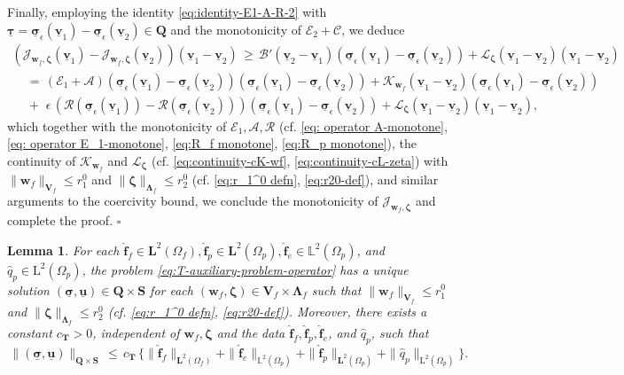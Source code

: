 \documentclass[11pt]{article}
\numberwithin{equation}{section}
\newcommand{\ds}{\displaystyle}
\newcommand{\bLambda}{{\boldsymbol\Lambda}}
\newcommand{\bsi}{{\boldsymbol\sigma}}
\newcommand{\btau}{{\boldsymbol\tau}}
\newcommand{\bzeta}{{\boldsymbol\zeta}}
\newcommand{\ubsi}{\underline{\bsi}}
\newcommand{\ubtau}{\underline{\btau}}
\newcommand{\ubu}{\underline{\bu}}
\newcommand{\ubv}{\underline{\bv}}
\newcommand{\bv}{{\mathbf{v}}}
\newcommand{\bw}{{\mathbf{w}}}
\newcommand{\f}{\mathbf{f}}
\newcommand{\bu}{\mathbf{u}}
\newcommand{\0}{{\mathbf{0}}}
\def\bV{\mathbf{V}}
\def\bT{\mathbf{T}}
\def\bQ{\mathbf{Q}}
\def\bS{\mathbf{S}}
\newcommand{\bL}{\mathbf{L}}
\newcommand\bbL{\mathbb{L}}
\newcommand{\cA}{\mathcal{A}}
\newcommand{\cB}{\mathcal{B}}
\newcommand{\cC}{\mathcal{C}}
\newcommand{\cE}{\mathcal{E}}
\newcommand{\cJ}{\mathcal{J}}
\newcommand{\cK}{\mathcal{K}}
\newcommand{\cL}{\mathcal{L}}
\newcommand{\cR}{\mathcal{R}}
\def\L{\mathrm{L}}
\def\wh{\widehat}
\newtheorem{lem}[thm]{Lemma}
\newenvironment{proof}{\noindent{\it Proof.}}{\hfill$\square$}
\numberwithin{equation}{section}
\begin{document}
\begin{proof}
Finally, employing the identity \eqref{eq:identity-E1-A-R-2} with $\ubtau = \ubsi_\epsilon(\ubv_1) - \ubsi_\epsilon(\ubv_2)\in \bQ$ and the monotonicity of $\cE_2 + \cC$, we deduce
\begin{equation*}
\begin{array}{l}
\ds (\cJ_{\bw_f,\bzeta}(\ubv_1) - \cJ_{\bw_f,\bzeta}(\ubv_2))(\ubv_1 - \ubv_2) 
\,\geq\, \cB'(\ubv_2 - \ubv_1)(\ubsi_\epsilon(\ubv_1) - \ubsi_\epsilon(\ubv_2))+\cL_{\bzeta}(\ubv_1 - \ubv_2) (\ubv_1 - \ubv_2)  \\ [2ex]
\ds\quad \,=\, (\cE_1 + \cA)(\ubsi_\epsilon(\ubv_1) - \ubsi_\epsilon(\ubv_2))(\ubsi_\epsilon(\ubv_1) - \ubsi_\epsilon(\ubv_2)) + \cK_{\bw_f}(\ubv_1 - \ubv_2)(\ubsi_\epsilon(\ubv_1) - \ubsi_\epsilon(\ubv_2)) \\ [2ex]
\ds\quad \,+\,\,\epsilon\,(\cR(\ubsi_\epsilon(\ubv_1)) - \cR(\ubsi_\epsilon(\ubv_2)))(\ubsi_\epsilon(\ubv_1) - \ubsi_\epsilon(\ubv_2))+\cL_{\bzeta}(\ubv_1 - \ubv_2) (\ubv_1 - \ubv_2) ,
\end{array}
\end{equation*}
which together with the monotonicity of $\cE_1, \cA, \cR$ (cf. \eqref{eq: operator A-monotone}, \eqref{eq: operator E_1-monotone}, \eqref{eq:R_f monotone}, \eqref{eq:R_p monotone}), the continuity of $\cK_{\bw_f}$ and $\cL_{\bzeta}$ (cf. \eqref{eq:continuity-cK-wf}, \eqref{eq:continuity-cL-zeta}) with $\|\bw_f\|_{\bV_f} \leq r_1^0$ and $\|\bzeta\|_{\bLambda_f} \leq r_2^0$ (cf. \eqref{eq:r_1^0 defn}, \eqref{eq:r20-def}), and similar arguments to the coercivity bound, we conclude the monotonicity of $\cJ_{\bw_f,\bzeta}$ and complete the proof.
\end{proof}
\begin{lem}\label{thm:well-posedness-1}
For each $\wh{\f}_f\in \bL^2(\Omega_f), \wh{\f}_p\in \bL^2(\Omega_p), \wh{\f}_e \in \bbL^2(\Omega_p)$, and $\wh{q}_p\in \L^2(\Omega_p)$, the problem \eqref{eq:T-auxiliary-problem-operator} has a unique solution $(\ubsi,\ubu)\in \bQ\times \bS$ for each $(\bw_f,\bzeta)\in \bV_f\times \bLambda_f$ such that $\|\bw_f\|_{\bV_f} \leq r_1^0$ and $\|\bzeta\|_{\bLambda_f} \leq r_2^0$ (cf. \eqref{eq:r_1^0 defn}, \eqref{eq:r20-def}).
Moreover, there exists a constant $c_\bT > 0$, independent of $\bw_f,\bzeta$ and the data $\wh{\f}_f, \wh{\f}_p, \wh{\f}_e $, and $\wh{q}_p$, such that
\begin{equation}\label{eq:ubsi-ubu-bound-solution}
\, \|(\ubsi, \ubu)\|_{\bQ\times \bS} 
\,\leq\, {c_\bT\,\Big\{ \|\wh{\f}_f\|_{\bL^2(\Omega_f)} +  \|\wh{\f}_e\|_{\bbL^2(\Omega_p)}+ \|\wh{\f}_p\|_{\bL^2(\Omega_p)} + \| \wh{q}_p\|_{\L^2(\Omega_p)}\Big\}}.
\end{equation}
\end{lem}
\end{document}
